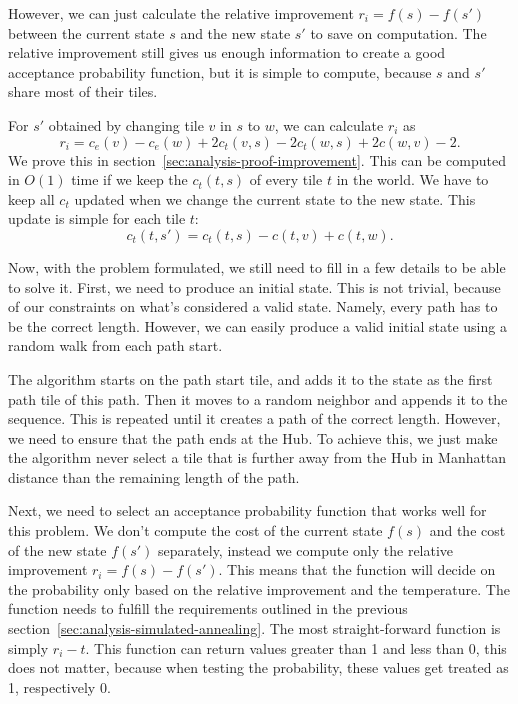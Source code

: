 However, we can just calculate the relative improvement $r_i = f(s) - f(s')$ between the current state $s$ and the new state $s'$ to save on computation.
The relative improvement still gives us enough information to create a good acceptance probability function, but it is simple to compute, because $s$ and $s'$ share most of their tiles.

For $s'$ obtained by changing tile $v$ in $s$ to $w$, we can calculate $r_i$ as
\begin{equation*}
    r_i = c_e(v) - c_e(w)  + 2 c_t(v,s) - 2 c_t(w,s) + 2c(w,v) - 2.
\end{equation*}
We prove this in section~\ref{sec:analysis-proof-improvement}.
This can be computed in $O(1)$ time if we keep the $c_t(t,s)$ of every tile $t$ in the world.
We have to keep all $c_t$ updated when we change the current state to the new state.
This update is simple for each tile $t$:
\begin{equation*}
    c_t(t,s') = c_t(t,s) - c(t,v) + c(t,w).
\end{equation*}

Now, with the problem formulated, we still need to fill in a few details to be able to solve it.
First, we need to produce an initial state.
This is not trivial, because of our constraints on what's considered a valid state.
Namely, every path has to be the correct length.
However, we can easily produce a valid initial state using a random walk from each path start.

The algorithm starts on the path start tile, and adds it to the state as the first path tile of this path.
Then it moves to a random neighbor and appends it to the sequence.
This is repeated until it creates a path of the correct length.
However, we need to ensure that the path ends at the Hub.
To achieve this, we just make the algorithm never select a tile that is further away from the Hub in Manhattan distance than the remaining length of the path.

Next, we need to select an acceptance probability function that works well for this problem.
We don't compute the cost of the current state $f(s)$ and the cost of the new state $f(s')$ separately, instead we compute only the relative improvement $r_i = f(s) - f(s')$.
This means that the function will decide on the probability only based on the relative improvement and the temperature.
The function needs to fulfill the requirements outlined in the previous section~\ref{sec:analysis-simulated-annealing}.
The most straight-forward function is simply $r_i - t$.
This function can return values greater than 1 and less than 0, this does not matter, because when testing the probability, these values get treated as 1, respectively 0.

